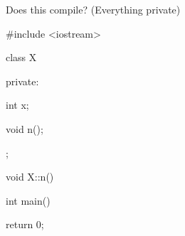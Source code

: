 Does this compile? (Everything private)



\begin{consolethree}[escapeinside=||]

#include <iostream>



class X

{

private:

    int x;

    void n();

};



void X::n()

{

}



int main()

{

    return 0;

}

\end{consolethree}

